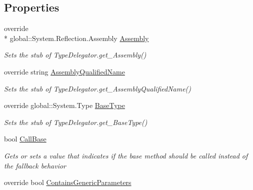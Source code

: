 \subsection*{Properties}
\begin{DoxyCompactItemize}
\item 
override \\*
global\-::\-System.\-Reflection.\-Assembly \hyperlink{class_system_1_1_reflection_1_1_fakes_1_1_stub_type_delegator_a82d167c19aa2403a3f0c1e7936829a11}{Assembly}
\begin{DoxyCompactList}\small\item\em Sets the stub of Type\-Delegator.\-get\-\_\-\-Assembly()\end{DoxyCompactList}\item 
override string \hyperlink{class_system_1_1_reflection_1_1_fakes_1_1_stub_type_delegator_ab9c2e3540ebbe2727df945860ddda8e4}{Assembly\-Qualified\-Name}
\begin{DoxyCompactList}\small\item\em Sets the stub of Type\-Delegator.\-get\-\_\-\-Assembly\-Qualified\-Name()\end{DoxyCompactList}\item 
override global\-::\-System.\-Type \hyperlink{class_system_1_1_reflection_1_1_fakes_1_1_stub_type_delegator_aebc3fbefbbce7416dcf21aad68a4eb0a}{Base\-Type}
\begin{DoxyCompactList}\small\item\em Sets the stub of Type\-Delegator.\-get\-\_\-\-Base\-Type()\end{DoxyCompactList}\item 
bool \hyperlink{class_system_1_1_reflection_1_1_fakes_1_1_stub_type_delegator_acc090984b16f0aaf890b004ef5fe80d6}{Call\-Base}
\begin{DoxyCompactList}\small\item\em Gets or sets a value that indicates if the base method should be called instead of the fallback behavior\end{DoxyCompactList}\item 
override bool \hyperlink{class_system_1_1_reflection_1_1_fakes_1_1_stub_type_delegator_a4adf71780db70ba99f63a35934c4e5e4}{Contains\-Generic\-Parameters}

\end{DoxyCompactItemize}
